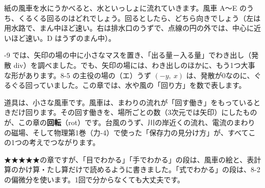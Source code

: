 \begin{hatena}
紙の風車を水にうかべると、水といっしょに流れていきます。風車 A〜E のうち、くるくる回るのはどれでしょう。回るとしたら、どちら向きでしょう（左は用水路で、まん中ほど速い。右は排水口のうずで、点線の円の外では、中心に近いほど速い。D はうずのまん中）。
\begin{bkcenter}
\end{bkcenter}
\end{hatena}

-9 では、矢印の場の中に小さなマスを置き、「出る量－入る量」でわき出し（発散 div）を調べました。でも、矢印の場には、わき出しのほかに、もう1つ大事な形があります。8-5 の主役の場の（エ）うず $(-y,\ x)$ は、発散が0なのに、ぐるぐる回っていました。この章では、水や風の「回り方」を数で表します。

道具は、小さな風車です。風車は、まわりの流れが「回す働き」をもっているときだけ回ります。その回す働きを、場所ごとの数（3次元では矢印）にしたものが、この章の\textbf{回転}（rot）です。台風のうず、川の岸近くの流れ、電流のまわりの磁場、そして物理第1巻（力-4）で使った「保存力の見分け方」が、すべてこの1つの考えでつながります。

★★★★★の章ですが、「目でわかる」「手でわかる」の段は、風車の絵と、表計算のかけ算・たし算だけで読めるように書きました。「式でわかる」の段は、8-2 の偏微分を使います。1回で分からなくても大丈夫です。

\begin{omoidasou}
\end{omoidasou}

